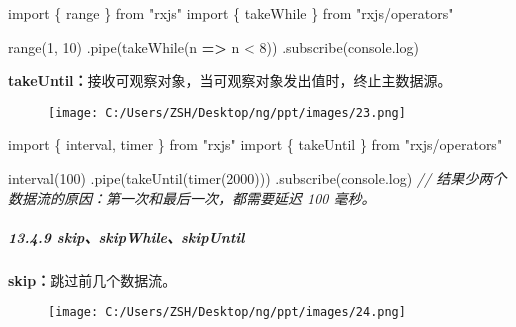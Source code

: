 \documentclass[
]{article}
\newenvironment{Shaded}{}{}
\newcommand{\BuiltInTok}[1]{#1}
\newcommand{\CommentTok}[1]{\textcolor[rgb]{0.38,0.63,0.69}{\textit{#1}}}
\newcommand{\DecValTok}[1]{\textcolor[rgb]{0.25,0.63,0.44}{#1}}
\newcommand{\FunctionTok}[1]{\textcolor[rgb]{0.02,0.16,0.49}{#1}}
\newcommand{\ImportTok}[1]{#1}
\newcommand{\KeywordTok}[1]{\textcolor[rgb]{0.00,0.44,0.13}{\textbf{#1}}}
\newcommand{\NormalTok}[1]{#1}
\newcommand{\OperatorTok}[1]{\textcolor[rgb]{0.40,0.40,0.40}{#1}}
\newcommand{\StringTok}[1]{\textcolor[rgb]{0.25,0.44,0.63}{#1}}
\begin{document}
\begin{Shaded}
\begin{Highlighting}[]
\ImportTok{import}\NormalTok{ \{ range \} }\ImportTok{from} \StringTok{"rxjs"}
\ImportTok{import}\NormalTok{ \{ takeWhile \} }\ImportTok{from} \StringTok{"rxjs/operators"}

\FunctionTok{range}\NormalTok{(}\DecValTok{1}\OperatorTok{,} \DecValTok{10}\NormalTok{)}
  \OperatorTok{.}\FunctionTok{pipe}\NormalTok{(}\FunctionTok{takeWhile}\NormalTok{(n }\KeywordTok{=\textgreater{}}\NormalTok{ n }\OperatorTok{\textless{}} \DecValTok{8}\NormalTok{))}
  \OperatorTok{.}\FunctionTok{subscribe}\NormalTok{(}\BuiltInTok{console}\OperatorTok{.}\FunctionTok{log}\NormalTok{)}
\end{Highlighting}
\end{Shaded}

\textbf{takeUntil：}接收可观察对象，当可观察对象发出值时，终止主数据源。

\begin{figure}
\centering
\texttt{[image: C:/Users/ZSH/Desktop/ng/ppt/images/23.png]}
\caption{}
\end{figure}

\begin{Shaded}
\begin{Highlighting}[]
\ImportTok{import}\NormalTok{ \{ interval}\OperatorTok{,}\NormalTok{ timer \} }\ImportTok{from} \StringTok{"rxjs"}
\ImportTok{import}\NormalTok{ \{ takeUntil \} }\ImportTok{from} \StringTok{"rxjs/operators"}

\FunctionTok{interval}\NormalTok{(}\DecValTok{100}\NormalTok{)}
  \OperatorTok{.}\FunctionTok{pipe}\NormalTok{(}\FunctionTok{takeUntil}\NormalTok{(}\FunctionTok{timer}\NormalTok{(}\DecValTok{2000}\NormalTok{)))}
  \OperatorTok{.}\FunctionTok{subscribe}\NormalTok{(}\BuiltInTok{console}\OperatorTok{.}\FunctionTok{log}\NormalTok{)}
\CommentTok{// 结果少两个数据流的原因：第一次和最后一次，都需要延迟 100 毫秒。}
\end{Highlighting}
\end{Shaded}

\hypertarget{1349-skipskipwhileskipuntil}{%
\subparagraph{13.4.9
skip、skipWhile、skipUntil}\label{1349-skipskipwhileskipuntil}}

\textbf{skip：}跳过前几个数据流。

\begin{figure}
\centering
\texttt{[image: C:/Users/ZSH/Desktop/ng/ppt/images/24.png]}
\caption{}
\end{figure}
\end{document}
